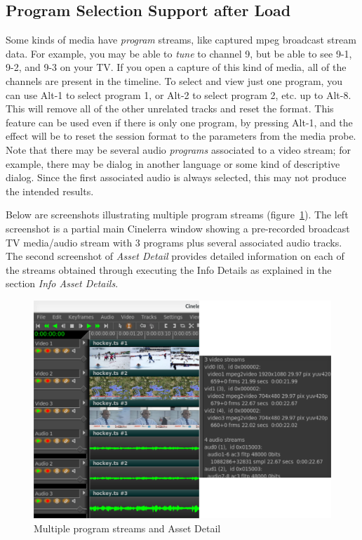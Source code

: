 \subsection{Program Selection Support after Load}%
\label{sub:program_selection_support_load}

Some kinds of media have \textit{program} streams, like captured mpeg broadcast stream data.  For example, you may be able to \textit{tune} to channel 9, but be able to see 9-1, 9-2, and 9-3 on your TV.  If you open a capture of this kind of media, all of the channels are present in the timeline.  To select and view just one program, you can use Alt-1 to select program 1, or Alt-2 to select program 2, etc. up to Alt-8.  This will remove all of the other unrelated tracks and reset the format.  This feature can be used even if there is only one program, by pressing Alt-1, and the effect will be to reset the session format to the parameters from the media probe.  Note that there may be several audio \textit{programs} associated to a video stream;
for example, there may be dialog in another language or some kind of descriptive dialog.  Since the first associated audio is always selected, this may not produce the intended results.

Below are screenshots illustrating multiple program streams (figure~\ref{fig:stream}).  The left screenshot is a partial main Cinelerra window showing a pre-recorded broadcast TV media/audio stream with 3 programs plus several associated audio tracks.  The second screenshot of \textit{Asset Detail} provides detailed information on each of the streams obtained through executing the Info Details as explained in the section \textit{Info Asset Details}.

\begin{figure}[htpb]
    \centering
    \includegraphics[width=0.8\linewidth]{images/stream.png}
    \caption{Multiple program streams and Asset Detail}
    \label{fig:stream}
\end{figure}

